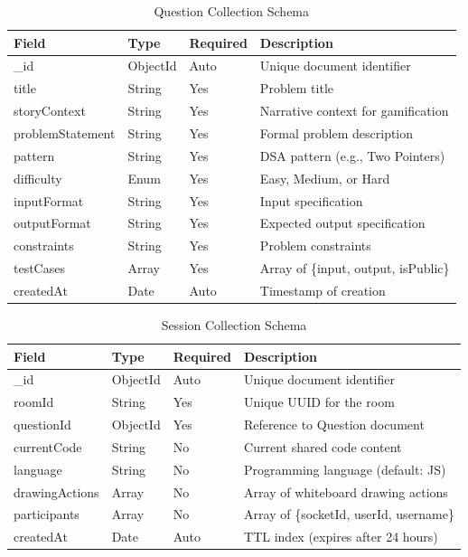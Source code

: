 \begin{table}[H]
\centering
\caption{Question Collection Schema}
\label{tab:questionschema}
\begin{reporttable}
\begin{tabular}{@{} l l l p{5cm} @{}}
\toprule
\textbf{Field} & \textbf{Type} & \textbf{Required} & \textbf{Description} \\
\midrule
\_id & ObjectId & Auto & Unique document identifier \\
title & String & Yes & Problem title \\
storyContext & String & Yes & Narrative context for gamification \\
problemStatement & String & Yes & Formal problem description \\
pattern & String & Yes & DSA pattern (e.g., Two Pointers) \\
difficulty & Enum & Yes & Easy, Medium, or Hard \\
inputFormat & String & Yes & Input specification \\
outputFormat & String & Yes & Expected output specification \\
constraints & String & Yes & Problem constraints \\
testCases & Array & Yes & Array of \{input, output, isPublic\} \\
createdAt & Date & Auto & Timestamp of creation \\
\bottomrule
\end{tabular}
\end{reporttable}
\end{table}

\begin{table}[H]
\centering
\caption{Session Collection Schema}
\label{tab:sessionschema}
\begin{reporttable}
\begin{tabular}{@{} l l l p{5cm} @{}}
\toprule
\textbf{Field} & \textbf{Type} & \textbf{Required} & \textbf{Description} \\
\midrule
\_id & ObjectId & Auto & Unique document identifier \\
roomId & String & Yes & Unique UUID for the room \\
questionId & ObjectId & Yes & Reference to Question document \\
currentCode & String & No & Current shared code content \\
language & String & No & Programming language (default: JS) \\
drawingActions & Array & No & Array of whiteboard drawing actions \\
participants & Array & No & Array of \{socketId, userId, username\} \\
createdAt & Date & Auto & TTL index (expires after 24 hours) \\
\bottomrule
\end{tabular}
\end{reporttable}
\end{table}

